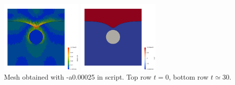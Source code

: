 \begin{center}
\includegraphics[width=4cm]{python_codes/fieldstone_93/results_exp2/sr_0136}
\includegraphics[width=4cm]{python_codes/fieldstone_93/results_exp2/mat_0136}\\
{\captionfont  Mesh obtained with -a0.00025 in script. Top row $t=0$, 
bottom row $t\simeq 30$.}
\end{center}


\newpage

